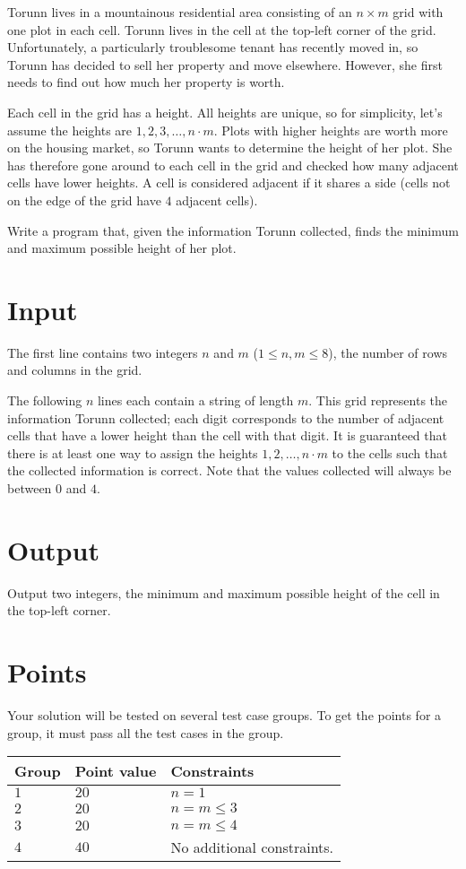 
\noindent
Torunn lives in a mountainous residential area consisting of an $n \times m$ grid with one plot in each cell.
Torunn lives in the cell at the top-left corner of the grid.
Unfortunately, a particularly troublesome tenant has recently moved in, so Torunn has decided to sell her property and move elsewhere.
However, she first needs to find out how much her property is worth.

Each cell in the grid has a height. All heights are unique, so for simplicity, let's assume the heights are $1, 2, 3, \dots, n \cdot m$.
Plots with higher heights are worth more on the housing market, so Torunn wants to determine the height of her plot. She has therefore gone around to each cell in the grid and checked how many adjacent cells have lower heights.
A cell is considered adjacent if it shares a side (cells not on the edge of the grid have $4$ adjacent cells).

Write a program that, given the information Torunn collected, finds the minimum and maximum possible height of her plot.

\section*{Input}
The first line contains two integers $n$ and $m$ ($1 \leq n, m \leq 8$), the number of rows and columns in the grid.

The following $n$ lines each contain a string of length $m$.
This grid represents the information Torunn collected; each digit corresponds to the number of adjacent cells that have a lower height than the cell with that digit.
It is guaranteed that there is at least one way to assign the heights $1, 2, \dots, n \cdot m$ to the cells such that the collected information is correct.
Note that the values collected will always be between $0$ and $4$.

\section*{Output}
Output two integers, the minimum and maximum possible height of the cell in the top-left corner.

\section*{Points}
Your solution will be tested on several test case groups.
To get the points for a group, it must pass all the test cases in the group.

\noindent
\begin{tabular}{| l | l | p{12cm} |}
  \hline
  \textbf{Group} & \textbf{Point value} & \textbf{Constraints} \\ \hline
  $1$    & $20$      & $n = 1$ \\ \hline
  $2$    & $20$      & $n = m \leq 3$ \\ \hline
  $3$    & $20$      & $n = m \leq 4$ \\ \hline
  $4$   & $40$        & No additional constraints. \\ \hline
\end{tabular}
